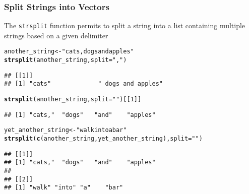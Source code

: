 \documentclass[paper=screen,mathserif]{beamer}\usepackage[]{graphicx}\usepackage[]{color}
\makeatletter
\newcommand{\hlnum}[1]{\textcolor[rgb]{0.686,0.059,0.569}{#1}}%
\newcommand{\hlstr}[1]{\textcolor[rgb]{0.192,0.494,0.8}{#1}}%
\newcommand{\hlstd}[1]{\textcolor[rgb]{0.345,0.345,0.345}{#1}}%
\newcommand{\hlkwb}[1]{\textcolor[rgb]{0.69,0.353,0.396}{#1}}%
\newcommand{\hlkwc}[1]{\textcolor[rgb]{0.333,0.667,0.333}{#1}}%
\newcommand{\hlkwd}[1]{\textcolor[rgb]{0.737,0.353,0.396}{\textbf{#1}}}%
\newenvironment{kframe}{%
 \def\at@end@of@kframe{}%
 \ifinner\ifhmode%
  \def\at@end@of@kframe{\end{minipage}}%
  \begin{minipage}{\columnwidth}%
 \fi\fi%
 \def\FrameCommand##1{\hskip\@totalleftmargin \hskip-\fboxsep
 \colorbox{shadecolor}{##1}\hskip-\fboxsep
     \hskip-\linewidth \hskip-\@totalleftmargin \hskip\columnwidth}%
 \MakeFramed {\advance\hsize-\width
   \@totalleftmargin\z@ \linewidth\hsize
   \@setminipage}}%
 {\par\unskip\endMakeFramed%
 \at@end@of@kframe}
\newenvironment{knitrout}{}{} %
\newcommand{\ft}[1]{\frametitle{#1}}
\newenvironment{xframe}[1][]
{\begin{frame}[fragile,environment=xframe]
    \frametitle{#1}}
  {\end{frame}}
\makeatother
\begin{document}
\begin{xframe}
  \ft{Split Strings into Vectors}
  
  The {\tt strsplit} function permits to split a string into a list
  containing multiple strings based on a given delimiter
\begin{knitrout}\scriptsize
{}\color{fgcolor}\begin{kframe}
\begin{alltt}
\hlstd{another_string} \hlkwb{<-} \hlstr{"cats, dogs and apples"}
\hlkwd{strsplit}\hlstd{(another_string,} \hlkwc{split} \hlstd{=} \hlstr{","}\hlstd{)}
\end{alltt}
\begin{verbatim}
## [[1]]
## [1] "cats"             " dogs and apples"
\end{verbatim}
\begin{alltt}
\hlkwd{strsplit}\hlstd{(another_string,} \hlkwc{split} \hlstd{=} \hlstr{" "}\hlstd{)[[}\hlnum{1}\hlstd{]]}
\end{alltt}
\begin{verbatim}
## [1] "cats,"  "dogs"   "and"    "apples"
\end{verbatim}
\end{kframe}
\end{knitrout}
\begin{knitrout}\scriptsize
{}\color{fgcolor}\begin{kframe}
\begin{alltt}
\hlstd{yet_another_string} \hlkwb{<-} \hlstr{"walk into a bar"}
\hlkwd{strsplit}\hlstd{(}\hlkwd{c}\hlstd{(another_string, yet_another_string),} \hlkwc{split} \hlstd{=} \hlstr{" "}\hlstd{)}
\end{alltt}
\begin{verbatim}
## [[1]]
## [1] "cats,"  "dogs"   "and"    "apples"
## 
## [[2]]
## [1] "walk" "into" "a"    "bar"
\end{verbatim}
\end{kframe}
\end{knitrout}

\end{xframe}
\end{document}
